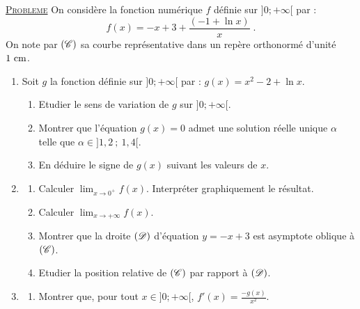 \noindent \underline{\textsc{Probleme}} \newline
      On consid\`ere la fonction num\'erique $f$ d\'efinie sur $]0 ; +\infty[$ par : 
      \[
            f(x) = - x + 3 + \frac{(-1+\ln x)}{x} \;.
      \]
      On note par $(\mathscr{C})$ sa courbe repr\'esentative dans un rep\`ere orthonorm\'e \Oij{} d'unit\'e $1~\mathrm{cm}$.
      \begin{enumerate}
            \item Soit $g$ la fonction d\'efinie sur $]0 ; +\infty[$ par : $g(x) = x^2 - 2 + \ln x$.
                  \begin{enumerate}
                        \item Etudier le sens de variation de $g$ sur $] 0 ; +\infty[$.
                        \item Montrer que l'\'equation $g(x) = 0$ admet une solution r\'eelle unique $\alpha$ telle que
                              $\alpha \in ] 1,2\ ;\ 1,4[$.
                        \item En d\'eduire le signe de $g(x)$ suivant les valeurs de $x$.
                  \end{enumerate}
            \item \begin{enumerate}
                        \item Calculer $\displaystyle{\lim_{x\rightarrow 0^+} f(x)}$.
                              Interpr\'eter graphiquement le r\'esultat.
                        \item Calculer $\displaystyle{\lim_{x\rightarrow +\infty} f(x)}$.
                        \item Montrer que la droite $(\mathscr{D})$ d'\'equation $y = -x + 3$ est asymptote oblique \`a $(\mathscr{C})$.
                        \item Etudier la position relative de $(\mathscr{C})$ par rapport \`a $(\mathscr{D})$.
                  \end{enumerate}
            \item \begin{enumerate}
                        \item Montrer que, pour tout $x \in ]0 ; +\infty[$, 
                              $\displaystyle{f'(x) = \frac{-g(x)}{x^2} }$.

\end{enumerate}
\end{enumerate}

